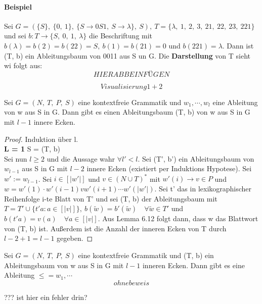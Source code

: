 \paragraph{Beispiel}     
    Sei \(G = (\{S\},\ \{0,\ 1\},\ \{S \to 0S1,\ S \to \lambda\},\ S),\ T = \{\lambda,\ 1,\ 2,\ 3,\ 21,\ 22,\ 23,\ 221\}\) und sei \(b:T\to\{S,\ 0,\ 1,\ \lambda\}\) die Beschriftung mit \(b(\lambda) = b(2) = b(22) = S,\ b(1) = b(21) = 0\) und \(b(221) = \lambda\). Dann ist (T, b) ein Ableitungsbaum von 0011 aus S un G. Die \textbf{Darstellung} von T sieht wi folgt aus: \[HIERABBEINFÜGEN\]

    \[Visualisierung 1 + 2 \]

    Sei \(G = (N,\ T,\ P,\ S)\) eine kontextfreie Grammatik und \(w_1, \cdots, w_l\) eine Ableitung von w aus S in G. Dann gibt es einen Ableitungsbaum (T, b) von w aus S in G mit \(l-1\) innere Ecken. 
    \begin{proof}
        Induktion über l.\\
        \textbf{L = 1} S = (T, b)\\
        Sei nun \(l \geq 2\) und die Aussage wahr \(\forall l' < l\). Sei (T', b') ein Ableitungsbaum von \(w_{l-1}\) aus S in G mit \(l-2\) innere Ecken (existiert per Induktions Hypotese). Sei \(w' := w_{l-1}\). Sei \(i \in [|w'|]\) und \(v \in (N \cup T)^*\) mit \(w'(i) \to v \in P\) und \(w = w'(1) \cdot w'(i-1) v w'(i+1)\cdots w'(|w'|)\). Sei t' das in lexikographischer Reihenfolge i-te Blatt von T' und sei (T, b) der Ableitungsbaum mit \(T = T' \cup \{t'a : a \in [|v|]\},\ b(\tilde{w}) = b'(\tilde{w}) \quad \forall \tilde{w} \in T'\) und \(b(t'a) = v(a) \quad \forall a \in [|v|]\). Aus Lemma 6.12 folgt dann, dass w das Blattwort von (T, b) ist. Außerdem ist die Anzahl der inneren Ecken von T durch \(l - 2 + 1 = l - 1\) gegeben.
    \end{proof}

    Sei \(G = (N,\ T,\ P,\ S)\) eine kontextfreie Grammatik und (T, b) ein Ableitungsbaum von w aus S in G mit \(l - 1\) inneren Ecken. Dann gibt es eine Ableitung \(\leq = w_1, \cdots\) 
    \[ohne beweis\]

    ??? ist hier ein fehler drin?


